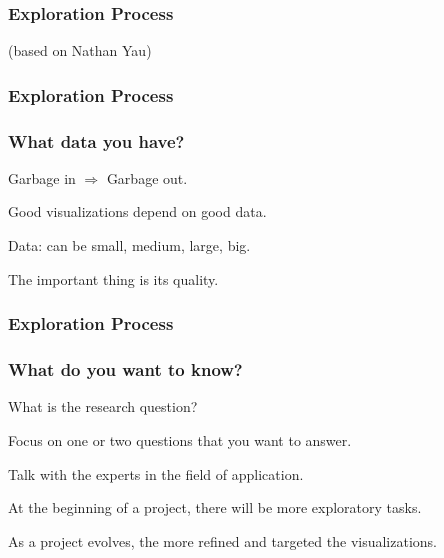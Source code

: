 \documentclass[12pt]{beamer}\usepackage[]{graphicx}\usepackage[]{color}
\begin{document}

\begin{frame}[fragile]
\frametitle{Exploration Process}
\begin{center}

{\scriptsize {\lolit (based on Nathan Yau)}}
\end{center}
\end{frame}


\begin{frame}[fragile]
\frametitle{Exploration Process}
\begin{center}
\end{center}
\end{frame}


\begin{frame}
\frametitle{What data you have?}

\bbi
  \item Garbage in $\Rightarrow$ Garbage out.
  \item Good visualizations depend on good data.
  \item Data: can be small, medium, large, big.
  \item The important thing is its quality.
\ei

\end{frame}


\begin{frame}[fragile]
\frametitle{Exploration Process}
\begin{center}
\end{center}
\end{frame}


\begin{frame}
\frametitle{What do you want to know?}

\bbi
  \item What is the research question?
  \item Focus on one or two questions that you want to answer.
  \item Talk with the experts in the field of application.
  \item At the beginning of a project, there will be more exploratory tasks.
  \item As a project evolves, the more refined and targeted the visualizations.
\ei

\end{frame}
\end{document}
